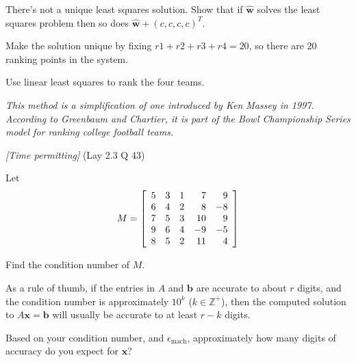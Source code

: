 \documentclass[12pt,letterpaper,noanswers]{exam}
\newcommand{\vc}[1]{\boldsymbol{#1}}
\begin{document}
\begin{questions}
There's not a unique least squares solution.  Show that if $\hat{\vc{w}}$ solves the least squares problem then so does $\hat{\vc{w}} + (c,c,c,c)^T$.

Make the solution unique by fixing $r1+r2+r3+r4 = 20$, so there are $20$ ranking points in the system.

Use linear least squares to rank the four teams.

\emph{This method is a simplification of one introduced by Ken Massey in 1997.  According to Greenbaum and Chartier, it is part of the Bowl Championship Series model for ranking college football teams.}

\item \emph{[Time permitting]} (Lay 2.3 Q 43)


Let \[M = \left[\begin{array}{r r r r r }
5 &3& 1& 7& 9 \\
6 &4 &2 &8 &-8 \\
7&5&3&10&9 \\
9&6&4&-9&-5 \\
8&5&2&11&4
\end{array}\right]\]
\begin{parts}
\item Find the condition number of $M$.

\item %

As a rule of thumb, if the entries in $A$ and $\vc{b}$ are accurate to about $r$ digits, and the condition number is approximately $10^k$ ($k\in\mathbb{Z}^+$), then the computed solution to $A\vc{x} = \vc{b}$ will usually be accurate to at least $r-k$ digits.

Based on your condition number, and $\epsilon_{\text{mach}}$, approximately how many digits of accuracy do you expect for $\vc{x}$?



\end{parts}
\end{questions}
\end{document}
